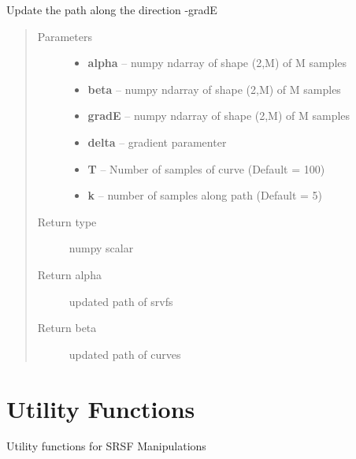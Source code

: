 \documentclass[letterpaper,10pt,english]{sphinxmanual}
\begin{document}

\begin{fulllineitems}
\label{geodesic:geodesic.update_path}
Update the path along the direction -gradE
\begin{quote}\begin{description}
\item[{Parameters}] \leavevmode\begin{itemize}
\item {} 
\textbf{alpha} -- numpy ndarray of shape (2,M) of M samples

\item {} 
\textbf{beta} -- numpy ndarray of shape (2,M) of M samples

\item {} 
\textbf{gradE} -- numpy ndarray of shape (2,M) of M samples

\item {} 
\textbf{delta} -- gradient paramenter

\item {} 
\textbf{T} -- Number of samples of curve (Default = 100)

\item {} 
\textbf{k} -- number of samples along path (Default = 5)

\end{itemize}

\item[{Return type}] \leavevmode
numpy scalar

\item[{Return alpha}] \leavevmode
updated path of srvfs

\item[{Return beta}] \leavevmode
updated path of curves

\end{description}\end{quote}

\end{fulllineitems}



\chapter{Utility Functions}
\label{utility_functions:module-utility_functions}\label{utility_functions::doc}\label{utility_functions:utility-functions}
Utility functions for SRSF Manipulations
\end{document}
